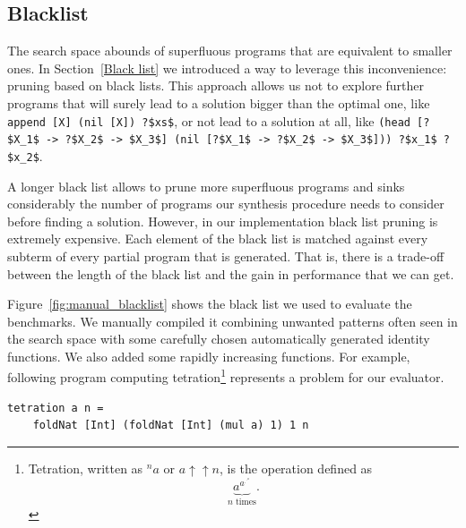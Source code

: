 \subsection{Blacklist}
The search space abounds of superfluous programs that are equivalent to smaller ones. In Section~\ref{Black list} we introduced a way to leverage this inconvenience: pruning based on black lists. This approach allows us not to explore further programs that will surely lead to a solution bigger than the optimal one, like \lstinline!append [X] (nil [X]) ?$xs$!, or not lead to a solution at all, like \lstinline!(head [?$X_1$ -> ?$X_2$ -> $X_3$] (nil [?$X_1$ -> ?$X_2$ -> $X_3$])) ?$x_1$ ?$x_2$!.

A longer black list allows to prune more superfluous programs and sinks considerably the number of programs our synthesis procedure needs to consider before finding a solution. However, in our implementation black list pruning is extremely expensive. Each element of the black list is matched against every subterm of every partial program that is generated. That is, there is a trade-off between the length of the black list and the gain in performance that we can get.

Figure~\ref{fig:manual_blacklist} shows the black list  we used to evaluate the benchmarks. We manually compiled it combining unwanted patterns often seen in the search space with some carefully chosen automatically generated identity functions. We also added some rapidly increasing functions. For example, following program computing tetration\footnote{Tetration, written as $^{n}a$ or $a \uparrow\uparrow n$, is the operation defined as \[\underbrace{a^{a^{.^{.^a}}}}_{n \text{ times}}.\]} represents a problem for our evaluator.
\begin{lstlisting}[style=plain]
tetration a n =
    foldNat [Int] (foldNat [Int] (mul a) 1) 1 n
\end{lstlisting}


